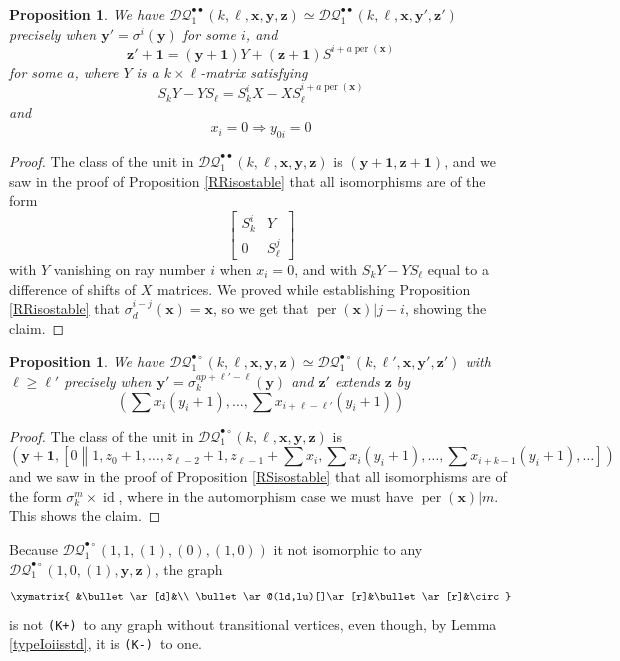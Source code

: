 \documentclass[12pt]{amsbook}%
\newtheorem{propo}[theor]{Proposition}
\theoremstyle{defin}
\theoremstyle{remark}
\numberwithin{equation}{chapter}
\numberwithin{theor}{section}
\newcommand{\KKKp}{\mbox{\texttt{\textup{(K+)}}}}
\newcommand{\KKKm}{\mbox{\texttt{\textup{(K-)}}}}
\newcommand{\DQp}{\mathcal{DQ}_1}
\newcommand{\id}{\operatorname{id}}
\newcommand{\RRi}{{\bullet\bullet}}
\newcommand{\RSi}{{\bullet\circ}}
\newcommand{\oXe}[2]{\left[#1\left\|{#2}\right.\right]}
\newcommand{\yy}{\mathbf{y}}
\newcommand{\zz}{\mathbf{z}}
\newcommand{\xx}{\mathbf{x}}
\newcommand{\uu}{\mathbf{1}}
\begin{document}
\begin{propo}\label{RRisoexact}
We have $\DQp^\RRi(k,\ell,\xx,\yy,\zz)\simeq \DQp^\RRi(k,\ell,\xx,\yy',\zz')$ precisely when $\yy'=\sigma^i(\yy)$ for some $i$, and
\[\zz'+\uu=(\yy+\uu)Y+(\zz+\uu)S^{i+a\operatorname{per}(\xx)}
\]
for some $a$, where $Y$ is a $k\times \ell$-matrix satisfying
\[
S_kY-YS_\ell=S_k^iX-XS_\ell^{i+a\operatorname{per}(\xx)}
\]
and
\[
x_{i}=0\Longrightarrow y_{0i}=0
\]
\end{propo}
\begin{proof}
The class of the unit in $\DQp^\RRi(k,\ell,\xx,\yy,\zz)$ is $(\yy+\uu,\zz+\uu)$, and we saw in the proof of Proposition \ref{RRisostable} that all  isomorphisms are of the form $$\begin{bmatrix}S_k^i&Y\\0&S_\ell^j\end{bmatrix}$$ with $Y$ vanishing on ray number $i$ when $x_{i}=0$, and with $S_kY-YS_\ell$ equal to a difference of shifts of $X$ matrices. We proved while establishing   Proposition \ref{RRisostable} that $\sigma_d^{i-j}(\xx)=\xx$, so we get that $\operatorname{per}(\xx)|j-i$, showing the claim.
\end{proof}


\begin{propo}\label{RSisoexact}
We have $\DQp^\RSi(k,\ell,\xx,\yy,\zz)\simeq \DQp^\RSi(k,\ell',\xx,\yy',\zz')$ with $\ell\geq \ell'$ precisely when $\yy'=\sigma_k^{ap+\ell'-\ell}(\yy)$ and $\zz'$ extends $\zz$ by
\[
\textstyle (\sum x_i (y_i+1),\dots,\sum x_{i+\ell-\ell'} (y_i+1))
\] 
\end{propo}
\begin{proof}
The class of the unit in $\DQp^\RSi(k,\ell,\xx,\yy,\zz)$ is 
\[
\left(\yy+\uu,\oXe{0}{\textstyle 1,z_0+1,\dots,z_{\ell-2}+1,z_{\ell-1}+\sum x_i,\sum x_i(y_i+1),\dots,\sum x_{i+k-1}(y_i+1),\dots}\right)
\]
and we saw in the proof of Proposition \ref{RSisostable} that all  isomorphisms are of the form $\sigma_k^m\times\id$, where in the automorphism case we must have  $\operatorname{per}(\xx)|m$. This shows the claim.
\end{proof}

Because $\DQp^\RSi(1,1,(1),(0),(1,0))$ it not isomorphic to any  $\DQp^\RSi(1,0,(1),\yy,\zz)$,  the graph
\[
\xymatrix{
&\bullet\ar[d]&\\
\bullet\ar@(ld,lu)[]\ar[r]&\bullet\ar[r]&\circ}
\]
is not \KKKp\ to any graph without transitional vertices, even though, by Lemma \ref{typeIoiisstd}, it is  \KKKm\ to one.
\end{document}
